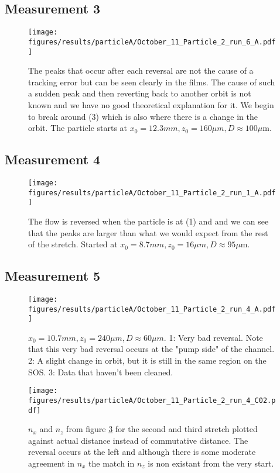 \subsection{Measurement 3}
\begin{figure}[H]
\begin{center}
\texttt{[image: figures/results/particleA/October\_11\_Particle\_2\_run\_6\_A.pdf]}
\end{center}
\caption{The peaks that occur after each reversal are not the cause of a tracking error but can be seen clearly in the films. The cause of such a sudden peak and then reverting back to another orbit is not known and we have no good theoretical explanation for it. We begin to break around (3) which is also where there is a change in the orbit. The particle starts at $ x_0 = 12.3 mm, z_0 = 160 \mu m, D \approx 100\mu$m.}
\label{fig:particleA3}
\end{figure}



\subsection{Measurement 4}
\begin{figure}[H]
\begin{center}
\texttt{[image: figures/results/particleA/October\_11\_Particle\_2\_run\_1\_A.pdf]}
\end{center}
\caption{The flow is reversed when the particle is at (1) and and we can see that the peaks are larger than what we would expect from the rest of the stretch. Started at $x_0 = 8.7 mm, z_0 = 16\mu m, D \approx 95\mu$m.}
\label{fig:particleA4}
\end{figure}

\subsection{Measurement 5}
\begin{figure}[H]
\centering
\texttt{[image: figures/results/particleA/October\_11\_Particle\_2\_run\_4\_A.pdf]}
\caption{$x_0 = 10.7 mm, z_0 = 240 \mu m, D \approx 60\mu m$.
1: Very bad reversal. Note that this very bad reversal occurs at the "pump side" of the channel. 
 2: A slight change in orbit, but it is still in the same region on the SOS.
 3: Data that haven't been cleaned.}
\label{fig:particleA5}
\end{figure}

 
 \begin{figure}[H]
 \centering
 \texttt{[image: figures/results/particleA/October\_11\_Particle\_2\_run\_4\_C02.pdf]}
 \caption{$n_x$ and $n_z$ from figure \ref{fig:particleA5} for the second and third stretch plotted against actual distance instead of commutative distance. The reversal occurs at the left and although there is some moderate agreement in $n_x$ the match in $n_z$ is non existant from the very start.}
 \label{fig:particleABadReversal}
 \end{figure}